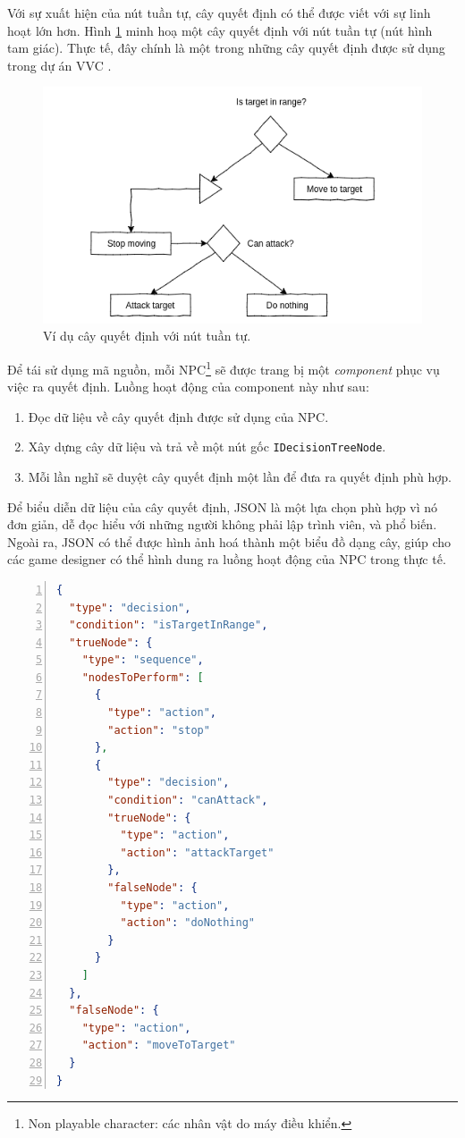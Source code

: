 \documentclass[12pt]{report}
\newcommand{\project}{VVC }
\begin{document}
Với sự xuất hiện của nút tuần tự, cây quyết định có thể được viết với sự linh hoạt lớn hơn. Hình \ref{fig:dectreereal} minh hoạ một cây quyết định với nút tuần tự (nút hình tam giác). Thực tế, đây chính là một trong những cây quyết định được sử dụng trong dự án \project.
\begin{figure}[H]
  \centering
    \includegraphics[width=13cm]{Pics/Chap5/realdectree.png}
  \caption{Ví dụ cây quyết định với nút tuần tự.}
  \label{fig:dectreereal}
\end{figure}

Để tái sử dụng mã nguồn, mỗi NPC\footnote{Non playable character: các nhân vật do máy điều khiển.} sẽ được trang bị một \textit{component} phục vụ việc ra quyết định. Luồng hoạt động của component này như sau:
\begin{enumerate}
	\item Đọc dữ liệu về cây quyết định được sử dụng của NPC.
	\item Xây dựng cây dữ liệu và trả về một nút gốc \texttt{IDecisionTreeNode}.
	\item Mỗi lần nghĩ sẽ duyệt cây quyết định một lần để đưa ra quyết định phù hợp.
\end{enumerate}

Để biểu diễn dữ liệu của cây quyết định, JSON là một lựa chọn phù hợp vì nó đơn giản, dễ đọc hiểu với những người không phải lập trình viên, và phổ biến. Ngoài ra, JSON có thể được hình ảnh hoá thành một biểu đồ dạng cây, giúp cho các game designer có thể hình dung ra luồng hoạt động của NPC trong thực tế. 
\begin{lstlisting}[frame=lines, language=json, basicstyle=\footnotesize\ttfamily, numbers=left, numberstyle=\tiny\color{black},caption= {Một file JSON mô tả cây quyết định}]
{
  "type": "decision",
  "condition": "isTargetInRange",
  "trueNode": {
    "type": "sequence",
    "nodesToPerform": [
      {
        "type": "action",
        "action": "stop"
      },
      {
        "type": "decision",
        "condition": "canAttack",
        "trueNode": {
          "type": "action",
          "action": "attackTarget"
        },
        "falseNode": {
          "type": "action",
          "action": "doNothing"
        }
      }
    ]
  },
  "falseNode": {
    "type": "action",
    "action": "moveToTarget"
  }
}
\end{lstlisting}
\end{document}
